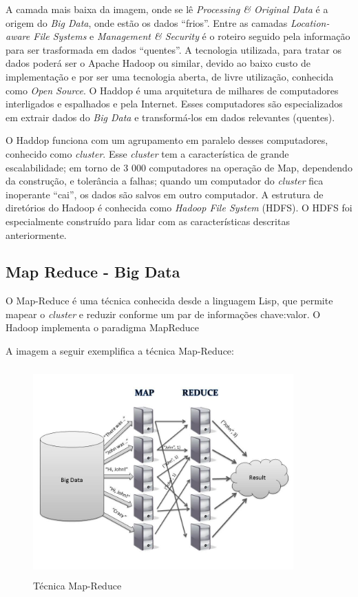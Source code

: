 \documentclass[conference,compsoc]{IEEEtran}
\begin{document}
A camada mais baixa da imagem, onde se lê \textit{Processing \& Original Data} é a origem do \textit{Big Data}, onde estão os dados ``frios''. Entre as camadas \textit{Location-aware File Systems} e \textit{Management \& Security} é o roteiro seguido pela informação para ser trasformada em dados ``quentes''. A tecnologia utilizada, para tratar os dados poderá ser o Apache Hadoop ou similar, devido ao baixo custo de implementação e por ser uma tecnologia aberta, de livre utilização, conhecida como \textit{Open Source}. O Haddop é uma arquitetura de milhares de computadores interligados e espalhados e pela Internet. Esses computadores são especializados em extrair dados do \textit{Big Data} e transformá-los em dados relevantes (quentes). \cite{Conejero2015}

O Haddop funciona com um agrupamento em paralelo desses computadores, conhecido como \textit{cluster}. Esse \textit{cluster} tem a característica de grande escalabilidade; em torno de 3 000 computadores na operação de Map, dependendo da construção, e tolerância a falhas; quando um computador do \textit{cluster} fica inoperante  ``cai'', os dados são salvos em outro computador. A estrutura de diretórios do Hadoop é conhecida como \textit{Hadoop File System} (HDFS). O HDFS foi especialmente construído para lidar com as características descritas anteriormente.



\subsection{Map Reduce - Big Data}\label{arte:palavraChave:MapReduceBigData}


O Map-Reduce é uma técnica conhecida desde a linguagem Lisp, que permite mapear o \textit{cluster} e reduzir conforme um par de informações \<chave:valor\>. 
O Hadoop implementa o paradigma MapReduce

A imagem a seguir exemplifica a técnica Map-Reduce:

\begin{figure}[ht]
\centering
\caption{Técnica Map-Reduce}
\includegraphics[width=100mm, height=80mm]{Figuras/MapReduce.jpg}
\end{figure}
\end{document}
